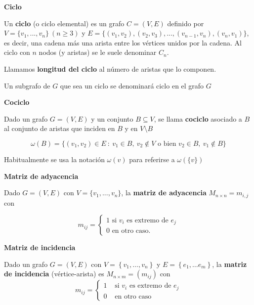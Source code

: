 \documentclass[openany]{book}
\begin{document}
\begin{definition}
  { \color{turquoise} \textbf{Ciclo}}

  Un \textbf{ciclo} (o ciclo elemental) es un grafo $C=(V,E)$ definido por $V= \{ v_1,...,v_n \}\ (n \geq 3)$ y $E= \{ (v_1,v_2), (v_2, v_3), ... , (v_{n-1}, v_n), (v_n, v_1) \}$, es decir, una cadena más una arista entre los vértices unidos por la cadena. Al ciclo con $ n $ nodos (y aristas) se le suele denominar $ C_n $.

  Llamamos \textbf{longitud del ciclo} al número de aristas que lo componen.

  Un subgrafo de $G$ que sea un ciclo se denominará ciclo en el grafo $ G $
\end{definition}

\begin{definition}
  { \color{turquoise} \textbf{Cociclo}}

  Dado un grafo $G=(V,E)$ y un conjunto $B \subseteq V$, se llama \textbf{cociclo} asociado a $ B $ al conjunto de aristas que inciden en $ B $ y en $ V \setminus B $

  $$ \omega (B) = \{ (v_1,v_2) \in E \ : \ v_1 \in B , \ v_2 \not \in V \text{ o bien }v_2 \in B, \ v_1 \not \in B \} $$

  Habitualmente se usa la notación $\omega (v)$ para referirse a $ \omega (\{ v \}) $
\end{definition}

\begin{definition}
  { \color{turquoise} \textbf{Matriz de adyacencia}}

  Dado $G = (V,E)$ con $V= \{ v_1,...,v_n \}$, la \textbf{matriz de adyacencia} $M_{n \times n}=m_{i,j}$ con

  $$ m_{ij} = \left\{ \begin{array}{l}
    1 \text{ si } v_i \text{ es extremo de } e_j\\
    0 \text{ en otro caso.}
  \end{array} \right. $$
\end{definition}

\begin{definition}
  { \color{turquoise} \textbf{Matriz de incidencia}}

  Dado un grafo $G=(V, E)$ con $V=\left\{v_{1}, \ldots, v_{n}\right\}$ y $E=\left\{e_{1}, \ldots e_{m}\right\}$, la \textbf{matriz de incidencia} (vértice-arista) es $M_{n \times m}=\left(m_{i j}\right)$ con
$$
m_{i j}= \begin{cases}1 & \text { si } v_{i} \text { es extremo de } e_{j} \\ 0 & \text { en otro caso }\end{cases}
$$
\end{definition}
\end{document}
